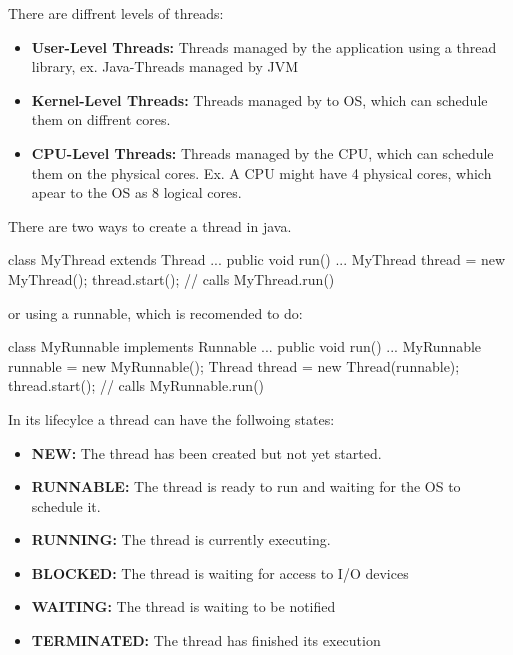             There are diffrent levels of threads:
            \begin{itemize}
    \item \textbf{User-Level Threads: } Threads managed by the application using a thread library, ex.
                    Java-Threads managed by JVM
    \item \textbf{Kernel-Level Threads: }Threads managed by to OS, which can schedule them on diffrent cores.
                
    \item \textbf{CPU-Level Threads:} Threads managed by the CPU, which can schedule them on the physical cores.
                    Ex. A CPU might have 4 physical cores, which apear to the OS as 8 logical cores.
\end{itemize}

            There are two ways to create a thread in java.

            \begin{codeexample}

                class MyThread extends Thread { ...
                public void run() {
                ...
                }
                }
                MyThread thread = new MyThread();
                thread.start(); // calls MyThread.run()
            
\end{codeexample}

            or using a runnable, which is recomended to do:

            \begin{codeexample}

                class MyRunnable implements Runnable { ...
                public void run() {
                ...
                }
                }
                MyRunnable runnable = new MyRunnable();
                Thread thread = new Thread(runnable);
                thread.start(); // calls MyRunnable.run()
            
\end{codeexample}

            In its lifecylce a thread can have the follwoing states:
            \begin{itemize}
    \item \textbf{NEW: }The thread has been created but not yet started.
    \item \textbf{RUNNABLE: }The thread is ready to run and waiting for the OS to schedule it.
    \item \textbf{RUNNING: }The thread is currently executing.
    \item \textbf{BLOCKED: }The thread is waiting for access to I/O devices
    \item \textbf{WAITING: }The thread is waiting to be notified
    \item \textbf{TERMINATED: }The thread has finished its execution
\end{itemize}

